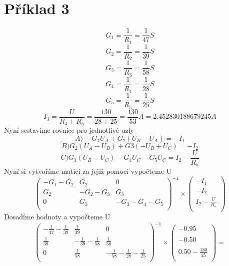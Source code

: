 \section{Příklad 3}
\[
  G_1 = \displaystyle\frac{1}{R_1}
  = \displaystyle\frac{1}{47}S
\]
\[
  G_2 = \displaystyle\frac{1}{R_2}
  = \displaystyle\frac{1}{39}S
\]
\[
  G_3 = \displaystyle\frac{1}{R_3}
  = \displaystyle\frac{1}{58}S
\]
\[
  G_4 = \displaystyle\frac{1}{R_4}
  = \displaystyle\frac{1}{28}S
\]
\[
  G_5 = \displaystyle\frac{1}{R_5}
  = \displaystyle\frac{1}{25}S
\]
\[
  I_3 = \displaystyle\frac{U}{R_4 + R_5}
  = \displaystyle\frac{130}{28 + 25}
  = \displaystyle\frac{130}{53}A
  = 2.452830188679245A
\]
 Nyní sestavíme rovnice pro jednotlivé uzly
 \[
   A)-G_1 U_A + G_2 (U_B - U_A ) = -I_1
 \]
 \[
   B)G_2(U_A-U_B)+G3(-U_B+U_C) = -I_2
 \]
 \[
   C)G_3(U_B-U_C)-G_4U_C-G_5U_C = I_2 - \displaystyle\frac{U}{R_5}
 \]
 Nyní si vytvoříme matici za jejiž pomocí vypočteme U
\[
  \begin{pmatrix}
    -G_1-G_2 & G_2 & 0\\
    G_2 & -G_2-G_3 & G_3\\
    0 & G_3 & -G_3-G_4-G_5\\
  \end{pmatrix}^{-1}
  \times
  \begin{pmatrix}
    -I_1\\
    -I_2\\
    I_2-\displaystyle\frac{U}{R_5}\\
  \end{pmatrix}
\]
Dosadíme hodnoty a vypočteme U\\
\[
  \begin{pmatrix}
    -\displaystyle\frac{1}{47} -\displaystyle\frac{1}{39} & \displaystyle\frac{1}{39} & 0\\
    \displaystyle\frac{1}{39} & -\displaystyle\frac{1}{39}-\displaystyle\frac{1}{58} & \displaystyle\frac{1}{58}\\
    0 & \displaystyle\frac{1}{58} & -\displaystyle\frac{1}{58}-\displaystyle\frac{1}{28}-\displaystyle\frac{1}{25}\\
  \end{pmatrix}^{-1}
  \times
  \begin{pmatrix}
    -0.95\\
    \\
    -0.50\\
    \\
    0.50-\displaystyle\frac{130}{25}\\
    
  \end{pmatrix}
  =
\]

